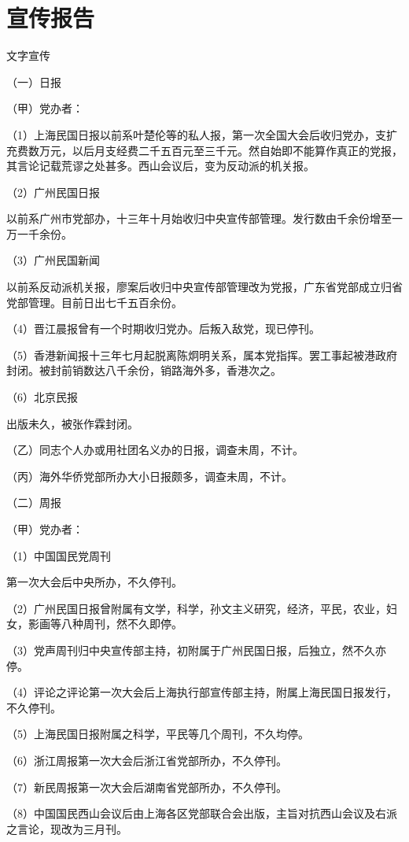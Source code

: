 \section[宣传报告]{宣传报告}


文字宣传

（一）日报

（甲）党办者：

（1）上海民国日报以前系叶楚伦等的私人报，第一次全国大会后收归党办，支扩充费数万元，以后月支经费二千五百元至三千元。然自始即不能算作真正的党报，其言论记载荒谬之处甚多。西山会议后，变为反动派的机关报。

（2）广州民国日报

以前系广州市党部办，十三年十月始收归中央宣传部管理。发行数由千余份增至一万一千余份。

（3）广州民国新闻

以前系反动派机关报，廖案后收归中央宣传部管理改为党报，广东省党部成立归省党部管理。目前日出七千五百余份。

（4）晋江晨报曾有一个时期收归党办。后叛入敌党，现已停刊。

（5）香港新闻报十三年七月起脱离陈炯明关系，属本党指挥。罢工事起被港政府封闭。被封前销数达八千余份，销路海外多，香港次之。

（6）北京民报

出版未久，被张作霖封闭。

（乙）同志个人办或用社团名义办的日报，调查未周，不计。

（丙）海外华侨党部所办大小日报颇多，调查未周，不计。

（二）周报

（甲）党办者：

（1）中国国民党周刊

第一次大会后中央所办，不久停刊。

（2）广州民国日报曾附属有文学，科学，孙文主义研究，经济，平民，农业，妇女，影画等八种周刊，然不久即停。

（3）党声周刊归中央宣传部主持，初附属于广州民国日报，后独立，然不久亦停。

（4）评论之评论第一次大会后上海执行部宣传部主持，附属上海民国日报发行，不久停刊。

（5）上海民国日报附属之科学，平民等几个周刊，不久均停。

（6）浙江周报第一次大会后浙江省党部所办，不久停刊。

（7）新民周报第一次大会后湖南省党部所办，不久停刊。

（8）中国国民西山会议后由上海各区党部联合会出版，主旨对抗西山会议及右派之言论，现改为三月刊。

